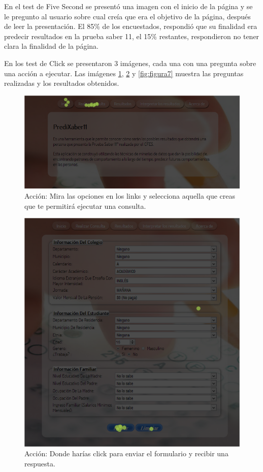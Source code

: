 En el test de Five Second se presentó una imagen con el inicio de la página y se le pregunto al usuario sobre cual creía que era el objetivo de la página, después de leer la presentación. El 85\% de los encuestados, respondió que su finalidad era predecir resultados en la prueba saber 11\degree, el 15\% restantes, respondieron no tener clara la finalidad de la página.

En los test de Click se presentaron 3 imágenes, cada una con una pregunta sobre una acción a ejecutar. Las imágenes \ref{fig:figura5}, \ref{fig:figura6} y \ref{fig:figura7} muestra las preguntas realizadas y los resultados obtenidos.
\begin{figure}[!htb]
\begin{centering}
\includegraphics[scale=0.7]{realizarconsultatest2}
\par\end{centering}
\caption{Acción: Mira las opciones en los links y selecciona aquella que creas que te permitirá ejecutar una consulta.}
\label{fig:figura5}
\end{figure}
\begin{figure}[!htb]
\begin{centering}
\includegraphics[scale=0.6]{enviarformulariotest}
\par\end{centering}
\caption{Acción: Donde harías click para enviar el formulario y recibir una respuesta.}
\label{fig:figura6}
\end{figure}
